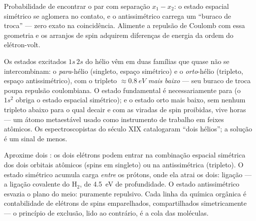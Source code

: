 \begin{omfigure}

{\small Probabilidade de encontrar o par com separação $x_1 - x_2$: o
estado espacial simétrico se aglomera no contato, e o antissimétrico
carrega um ``buraco de troca'' --- zero exato na coincidência.
Alimente a repulsão de Coulomb com essa geometria e os arranjos de spin
adquirem diferenças de energia da ordem do elétron-volt.}
\end{omfigure}

\begin{example}\label{ex:b3:identical-particles:helium}
Os estados excitados $1s\,2s$ do hélio vêm em duas famílias que quase
não se intercombinam: o \emph{para}-hélio (singleto, espaço simétrico)
e o \emph{orto}-hélio (tripleto, espaço antissimétrico), com o tripleto
$\approx\qty{0.8}{eV}$ \emph{mais baixo} --- seu buraco de troca poupa
repulsão coulombiana. O estado fundamental é necessariamente para (o
$1s^2$ obriga o estado espacial simétrico); e o estado orto mais baixo,
sem nenhum tripleto abaixo para o qual decair e com as viradas de spin
proibidas, vive horas --- um átomo metaestável usado como instrumento
de trabalho em feixes atômicos. Os espectroscopistas do século XIX
catalogaram ``dois hélios''; a solução é um sinal de menos.
\end{example}

\begin{example}\label{ex:b3:identical-particles:bond}
Aproxime dois : os dois elétrons podem entrar na
combinação espacial simétrica dos dois orbitais atômicos (spins em
singleto) ou na antissimétrica (tripleto). O estado simétrico acumula
carga \emph{entre} os prótons, onde ela atrai os dois: ligação --- a
ligação covalente do H$_2$, de \qty{4.5}{eV} de profundidade. O estado
antissimétrico esvazia o plano do meio: puramente repulsivo. Cada linha
da química orgânica é contabilidade de elétrons de spins emparelhados,
compartilhados simetricamente --- o princípio de exclusão, lido ao
contrário, é a cola das moléculas.
\end{example}

